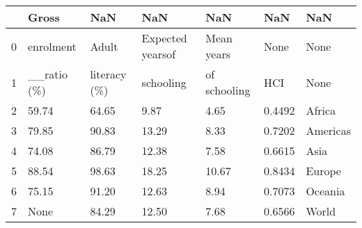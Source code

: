 \begin{tabular}{lllllll}
\toprule
{} &        Gross &           NaN &               NaN &           NaN &     NaN &       NaN \\
\midrule
0 &    enrolment &         Adult &  Expected yearsof &    Mean years &    None &      None \\
1 &  \_\_ratio (\%) &  literacy (\%) &         schooling &  of schooling &     HCI &      None \\
2 &        59.74 &         64.65 &              9.87 &          4.65 &  0.4492 &    Africa \\
3 &        79.85 &         90.83 &             13.29 &          8.33 &  0.7202 &  Americas \\
4 &        74.08 &         86.79 &             12.38 &          7.58 &  0.6615 &      Asia \\
5 &        88.54 &         98.63 &             18.25 &         10.67 &  0.8434 &    Europe \\
6 &        75.15 &         91.20 &             12.63 &          8.94 &  0.7073 &   Oceania \\
7 &         None &         84.29 &             12.50 &          7.68 &  0.6566 &     World \\
\bottomrule
\end{tabular}
